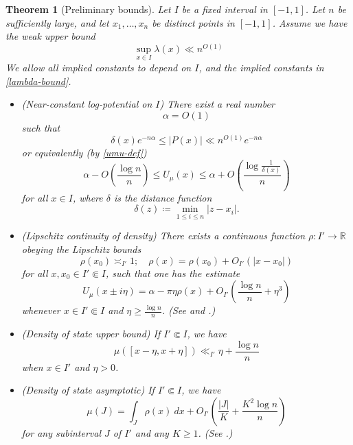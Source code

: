 \documentclass[12pt]{amsart}
\newtheorem{theorem}{Theorem}[section]
\newcommand{\R}{\mathbb{R}}
\begin{document}
\begin{theorem}[Preliminary bounds]\label{prelim}  Let $I$ be a fixed interval in $[-1,1]$. Let $n$ be sufficiently large, and let $x_1,\dots,x_n$ be distinct points in $[-1,1]$.
Assume we have the weak upper bound
\begin{equation}\label{lambda-bound}
\sup_{x \in I} \lambda(x) \ll n^{O(1)}
\end{equation}
We allow all implied constants to depend on $I$, and the implied constants in \eqref{lambda-bound}.
\begin{itemize}
    \item[(i)] (Near-constant log-potential on $I$) There exist a real number
\begin{equation}\label{alpha}
 \alpha = O(1)
\end{equation}
such that
\begin{equation}\label{deltax}
 \delta(x) e^{-n\alpha} \leq |P(x)| \ll n^{O(1)} e^{-n\alpha}
\end{equation}
or equivalently (by \eqref{umu-def})
\begin{equation}\label{umu-bound} \alpha - O\left( \frac{\log n}{n} \right) \leq U_\mu(x) \leq \alpha + O\left( \frac{\log \frac{1}{\delta(x)}}{n} \right)
\end{equation}
for all $x \in I$, where $\delta$ is the distance function
\begin{equation}\label{delta-def}
 \delta(z) \coloneqq \min_{1 \leq i \leq n} |z-x_i|.
\end{equation}
    \item[(ii)]  (Lipschitz continuity of density) There exists a continuous function $\rho \colon I'\to \R$ obeying the Lipschitz bounds
\begin{equation}\label{goa}
 \rho(x_0) \asymp_{I'} 1; \quad \rho(x) = \rho(x_0) + O_{I'}(|x-x_0|)
\end{equation}
for all $x, x_0 \in I' \Subset I$, such that one has the estimate
\begin{equation}\label{umud}
 U_\mu(x \pm i\eta) = \alpha - \pi \eta \rho(x) + O_{I'}\left( \frac{\log n}{n} + \eta^3 \right)
\end{equation}
whenever $x \in I' \Subset I$ and $\eta \geq \frac{\log n}{n}$.  (See  and .)
    \item[(iii)] (Density of state upper bound) If $I' \Subset I$, we have
\begin{equation}\label{mueta}
 \mu( [x-\eta, x+\eta] ) \ll_{I'} \eta + \frac{\log n}{n}
\end{equation}
when $x \in I'$ and $\eta > 0$.
    \item[(iv)] (Density of state asymptotic) If $I' \Subset I$, we have
\begin{equation}\label{muj}
 \mu(J) = \int_J \rho(x)\ dx + O_{I'}\left( \frac{|J|}{K} + \frac{K^2 \log n}{n} \right)
\end{equation}
for any subinterval $J$ of $I'$ and any $K \geq 1$.  (See .)
\end{itemize}
\end{theorem}
\end{document}
